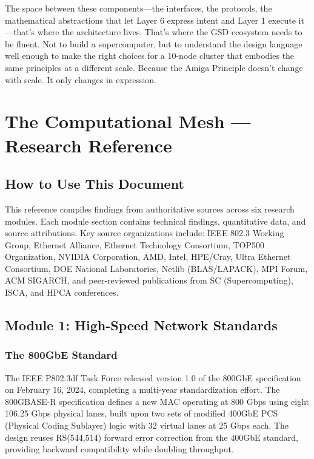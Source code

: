 \documentclass[11pt,letterpaper]{article}
\newcommand{\stageheader}[2]{%
  \noindent\colorbox{#2}{\makebox[\textwidth][l]{%
    \textcolor{white}{\bfseries\sffamily\hspace{6pt}#1\hspace{6pt}}}}%
  \vspace{0.5em}\par%
}
\begin{document}
The space between these components---the interfaces, the protocols, the mathematical abstractions that let Layer 6 express intent and Layer 1 execute it---that's where the architecture lives. That's where the GSD ecosystem needs to be fluent. Not to build a supercomputer, but to understand the design language well enough to make the right choices for a 10-node cluster that embodies the same principles at a different scale. Because the Amiga Principle doesn't change with scale. It only changes in expression.

\newpage

\stageheader{STAGE 2 --- RESEARCH REFERENCE}{secondary}

\section{The Computational Mesh --- Research Reference}

\subsection{How to Use This Document}

This reference compiles findings from authoritative sources across six research modules. Each module section contains technical findings, quantitative data, and source attributions. Key source organizations include: IEEE 802.3 Working Group, Ethernet Alliance, Ethernet Technology Consortium, TOP500 Organization, NVIDIA Corporation, AMD, Intel, HPE/Cray, Ultra Ethernet Consortium, DOE National Laboratories, Netlib (BLAS/LAPACK), MPI Forum, ACM SIGARCH, and peer-reviewed publications from SC (Supercomputing), ISCA, and HPCA conferences.

\subsection{Module 1: High-Speed Network Standards}

\subsubsection{The 800GbE Standard}

The IEEE P802.3df Task Force released version 1.0 of the 800GbE specification on February 16, 2024, completing a multi-year standardization effort. The 800GBASE-R specification defines a new MAC operating at 800 Gbps using eight 106.25 Gbps physical lanes, built upon two sets of modified 400GbE PCS (Physical Coding Sublayer) logic with 32 virtual lanes at 25 Gbps each. The design reuses RS(544,514) forward error correction from the 400GbE standard, providing backward compatibility while doubling throughput.
\end{document}
